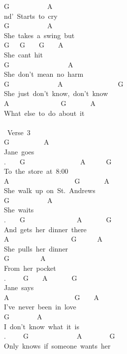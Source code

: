 {G\ \ \ \ \ \ \ \ \ \ \ A\\
nd'\ Starts\ to\ cry\\
G\ \ \ \ \ \ \ \ \ \ \ A\\
She\ takes\ a\ swing\ but\\
G\ \ \ G\ \ \ \ G\ \ \ \ A\\
She\ cant\ hit\\
G\ \ \ \ \ \ \ \ \ \ \ \ \ \ \ \ \ A\\
She\ don't\ mean\ no\ harm\\
G\ \ \ \ \ \ \ \ \ \ \ \ \ \ A\ \ \ \ \ \ \ \ \ \ \ \ \ \ \ \ G\\
She\ just\ don't\ know,\ don't\ know\\
A\ \ \ \ \ \ \ \ \ \ \ \ \ \ \ G\ \ \ \ \ \ \ A\\
What\ else\ to\ do\ about\ it\\
\\
\lbrack\ Verse\ 3\rbrack\\
G\ \ \ \ \ \ \ \ \ \ A\\
Jane\ goes\\
.\ \ \ \ G\ \ \ \ \ \ \ \ \ \ \ \ \ \ \ \ A\ \ \ \ \ \ G\\
To\ the\ store\ at\ 8:00\\
A\ \ \ \ \ \ \ \ \ \ \ \ \ \ \ \ \ \ \ G\ \ \ \ \ \ \ A\\
She\ walk\ up\ on\ St.\ Andrews\\
G\ \ \ \ \ \ \ \ \ \ \ A\\
She\ waits\\
.\ \ \ \ G\ \ \ \ \ \ \ \ \ \ \ \ \ \ \ A\ \ \ \ \ \ \ G\\
And\ gets\ her\ dinner\ there\\
A\ \ \ \ \ \ \ \ \ \ \ \ \ \ \ \ \ \ G\ \ \ \ \ \ A\\
She\ pulls\ her\ dinner\\
G\ \ \ \ \ \ \ \ \ A\\
From\ her\ pocket\\
.\ \ \ \ \ G\ \ \ \ A\ \ \ \ \ \ \ G\\
Jane\ says\\
A\ \ \ \ \ \ \ \ \ \ \ \ \ \ \ \ \ \ \ G\ \ \ \ A\\
I've\ never\ been\ in\ love\\
G\ \ \ \ \ \ \ \ A\\
I\ don't\ know\ what\ it\ is\\
.\ \ \ \ \ G\ \ \ \ \ \ \ \ \ \ \ \ \ \ A\ \ \ \ \ \ \ \ G\\
Only\ knows\ if\ someone\ wants\ her\\
}
